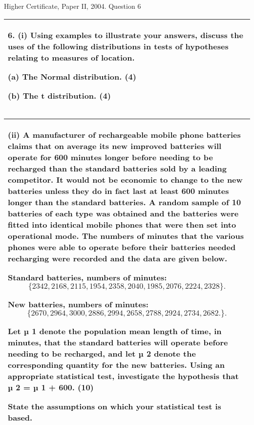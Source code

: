\documentclass[a4paper,12pt]{article}
\begin{document}
Higher Certificate, Paper II, 2004. Question 6


\begin{table}[ht!]
 
\centering
 
\begin{tabular}{|p{15cm}|}
 
\hline  

6. (i) Using examples to illustrate your answers, discuss the uses of the following distributions in tests of hypotheses relating to measures of location. 
 
(a) The Normal distribution. 
(4) 
 
(b) The t distribution. 
(4) 
 
\\ \hline
  
\end{tabular}

\end{table} 

\begin{table}[ht!]
 
\centering
 
\begin{tabular}{|p{15cm}|}
 
\hline  


 
(ii) A manufacturer of rechargeable mobile phone batteries claims that on average its new improved batteries will operate for 600 minutes longer before needing to be recharged than the standard batteries sold by a leading competitor.  It would not be economic to change to the new batteries unless they do in fact last at least 600 minutes longer than the standard batteries.  A random sample of 10 batteries of each type was obtained and the batteries were fitted into identical mobile phones that were then set into operational mode.  The numbers of minutes that the various phones were able to operate before their batteries needed recharging were recorded and the data are given below. 
 
   Standard batteries, numbers of minutes: 
\[ \{2342,   2168,   2115,   1954,   2358,   2040,   1985,   2076,   2224,   2328 \}.\]
 
   New batteries, numbers of minutes: 
\[ \{ 2670,   2964,   3000,   2886,   2994,   2658,   2788,   2924,   2734,   2682. \}.\]
 
Let µ 1 denote the population mean length of time, in minutes, that the standard batteries will operate before needing to be recharged, and let µ 2 denote the corresponding quantity for the new batteries.  Using an appropriate statistical test, investigate the hypothesis that µ 2 = µ 1 + 600. (10) 
 
State the assumptions on which your statistical test is based. 


\\ \hline
  
\end{tabular}

\end{table} 
\end{document}
